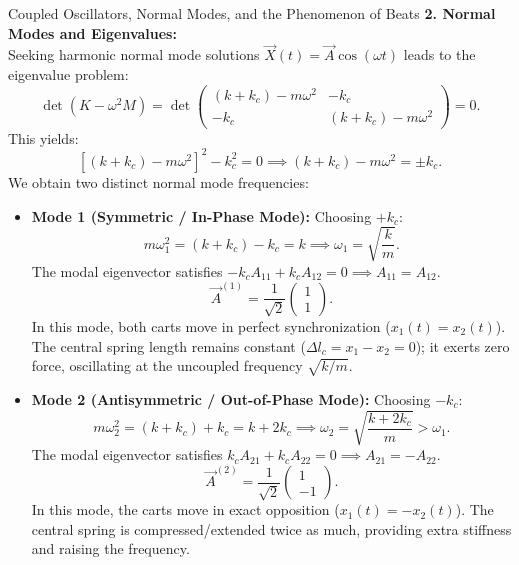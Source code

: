 \begin{workedexample}{Coupled Oscillators, Normal Modes, and the Phenomenon of Beats}
\textbf{2. Normal Modes and Eigenvalues:}\\
Seeking harmonic normal mode solutions $\vec{X}(t) = \vec{A} \cos(\omega t)$ leads to the eigenvalue problem:
\[
\det\left( K - \omega^2 M \right) = \det\begin{pmatrix} (k + k_c) - m\omega^2 & -k_c \\ -k_c & (k + k_c) - m\omega^2 \end{pmatrix} = 0.
\]
This yields:
\[
\left[(k + k_c) - m\omega^2\right]^2 - k_c^2 = 0 \implies (k + k_c) - m\omega^2 = \pm k_c.
\]
We obtain two distinct normal mode frequencies:
\begin{itemize}[leftmargin=1.5em,itemsep=3pt]
  \item \textbf{Mode 1 (Symmetric / In-Phase Mode):} Choosing $+k_c$:
  \[
  m\omega_1^2 = (k + k_c) - k_c = k \implies \omega_1 = \sqrt{\frac{k}{m}}.
  \]
  The modal eigenvector satisfies $-k_c A_{11} + k_c A_{12} = 0 \implies A_{11} = A_{12}$.
  \[
  \vec{A}^{(1)} = \frac{1}{\sqrt{2}}\begin{pmatrix} 1 \\ 1 \end{pmatrix}.
  \]
  In this mode, both carts move in perfect synchronization ($x_1(t) = x_2(t)$). The central spring length remains constant ($\Delta l_c = x_1 - x_2 = 0$); it exerts zero force, oscillating at the uncoupled frequency $\sqrt{k/m}$.
  \item \textbf{Mode 2 (Antisymmetric / Out-of-Phase Mode):} Choosing $-k_c$:
  \[
  m\omega_2^2 = (k + k_c) + k_c = k + 2k_c \implies \omega_2 = \sqrt{\frac{k + 2k_c}{m}} > \omega_1.
  \]
  The modal eigenvector satisfies $k_c A_{21} + k_c A_{22} = 0 \implies A_{21} = -A_{22}$.
  \[
  \vec{A}^{(2)} = \frac{1}{\sqrt{2}}\begin{pmatrix} 1 \\ -1 \end{pmatrix}.
  \]
  In this mode, the carts move in exact opposition ($x_1(t) = -x_2(t)$). The central spring is compressed/extended twice as much, providing extra stiffness and raising the frequency.
\end{itemize}


\end{workedexample}
